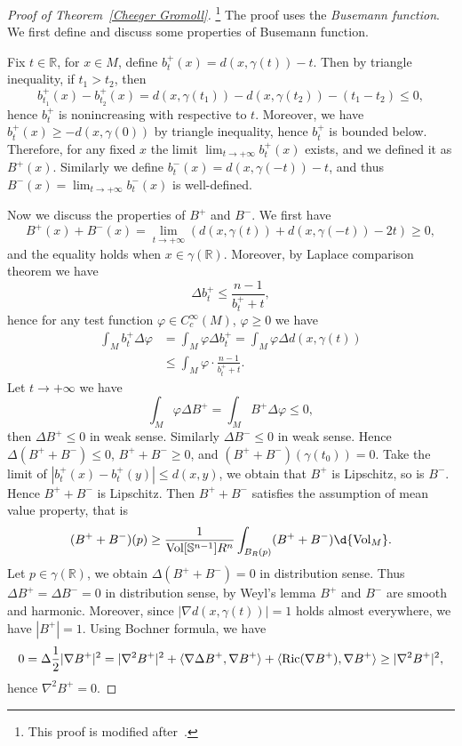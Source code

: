 \begin{proof}[Proof of Theorem~\ref{Cheeger Gromoll}]%
    \footnote{This proof is modified after~\cite[Section~1.2]{Shoen-Yau}.}
    The proof uses the \emph{Busemann function}.
    We first define and discuss some properties of Busemann function.

    Fix $t\in\mathbb{R}$, for $x\in M$, define $b^+_t(x)=d(x,\gamma(t))-t$.
    Then by triangle inequality, if $t_1>t_2$, then
    \[b_{t_1}^+(x)-b_{t_2}^+(x)=d(x,\gamma(t_1))-d(x,\gamma(t_2))-(t_1-t_2)\leq 0,\]
    hence $b_t^+$ is nonincreasing with respective to $t$.
    Moreover, we have $b_t^+(x)\geq-d(x,\gamma(0))$ by triangle inequality, hence $b_t^+$ is bounded below.
    Therefore, for any fixed $x$ the limit $\lim_{t\to+\infty}b^+_t(x)$ exists, and we defined it as $B^+(x)$.
    Similarly we define $b^-_t(x)=d(x,\gamma(-t))-t$, and thus $B^-(x)=\lim_{t\to+\infty}b^-_t(x)$ is well-defined.

    Now we discuss the properties of $B^+$ and $B^-$.
    We first have
    \[B^+(x)+B^-(x)=\lim_{t\to+\infty}(d(x,\gamma(t))+d(x,\gamma(-t))-2t)\geq 0,\]
    and the equality holds when $x\in\gamma(\mathbb{R})$.
    Moreover, by Laplace comparison theorem we have
    \[\Delta b^+_t\leq\frac{n-1}{b^+_t+t},\]
    hence for any test function $\varphi\in C^\infty_c(M)$, $\varphi\geq 0$ we have
    \begin{align*}
        \int_Mb^+_t\Delta\varphi&=\int_M\varphi\Delta b^+_t=\int_M\varphi\Delta d(x,\gamma(t))\\
        &\leq\int_M\varphi\cdot\frac{n-1}{b^+_t+t}.
    \end{align*}
    Let $t\to+\infty$ we have
    \[\int_M\varphi\Delta B^+=\int_M B^+\Delta\varphi\leq 0,\]
    then $\Delta B^+\leq 0$ in weak sense.
    Similarly $\Delta B^-\leq 0$ in weak sense.
    Hence $\Delta(B^++B^-)\leq 0$, $B^++B^-\geq 0$, and $(B^++B^-)(\gamma(t_0))=0$.
    Take the limit of $|b_t^+(x)-b_t^+(y)|\leq d(x,y)$, we obtain that $B^+$ is Lipschitz, so is $B^-$.
    Hence $B^++B^-$ is Lipschitz.
    Then $B^++B^-$ satisfies the assumption of mean value property, that is
    \[(B^++B^-)(p)\geq\frac{1}{\Vol[\mathbb{S}^{n-1}]R^n}\int_{B_R(p)}(B^++B^-)\d{\Vol_{M}}.\]
    Let $p\in\gamma(\mathbb{R})$, we obtain $\Delta(B^++B^-)=0$ in distribution sense.
    Thus $\Delta B^+=\Delta B^-=0$ in distribution sense, by Weyl's lemma $B^+$ and $B^-$ are smooth and harmonic.
    Moreover, since $|\nabla d(x,\gamma(t))|=1$ holds almost everywhere, we have $|B^+|=1$.
    Using Bochner formula, we have
    \[0=\Delta\frac{1}{2}|\nabla B^+|^2=|\nabla^2B^+|^2+\langle\nabla\Delta B^+,\nabla B^+\rangle+\langle\operatorname{Ric}(\nabla B^+),\nabla B^+\rangle\geq|\nabla^2B^+|^2,\]
    hence $\nabla^2B^+=0$.


\end{proof}
